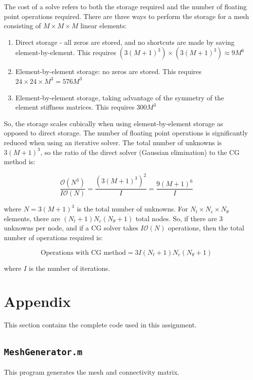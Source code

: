 \documentclass[10pt]{article}
\begin{document}
The cost of a solve refers to both the storage required and the number of floating point operations required. There are three ways to perform the storage for a mesh consisting of \(M\times M\times M\) linear elements:

\begin{enumerate}
\item Direct storage - all zeros are stored, and no shortcuts are made by saving element-by-element. This requires \((3(M+1)^3)\times(3(M+1)^3)\approx9M^6\)
\item Element-by-element storage: no zeros are stored. This requires \(24\times24\times M^3=576M^3\)
\item Element-by-element storage, taking advantage of the symmetry of the element stiffness matrices. This requires \(300M^3\)
\end{enumerate} 

So, the storage scales cubically when using element-by-element storage as opposed to direct storage. The number of floating point operations is significantly reduced when using an iterative solver. The total number of unknowns is \(3(M+1)^3\), so the ratio of the direct solver (Gaussian elimination) to the CG method is:

\begin{equation}
\frac{\mathscr{O}(N^3)}{I\mathscr{O}(N)}=\frac{\left(3(M+1)^3\right)^2}{I}=\frac{9(M+1)^6}{I}
\end{equation}

where \(N=3(M+1)^3\) is the total number of unknowns. For \(N_t\times N_c\times N_\theta\) elements, there are \((N_t+1)N_c(N_\theta+1)\) total nodes. So, if there are 3 unknowns per node, and if a CG solver takes \(I\mathscr{O}(N)\) operations, then the total number of operations required is:

\begin{equation}
\text{Operations with CG method}=3I(N_t+1)N_c(N_\theta+1)
\end{equation}
 
 where \(I\) is the number of iterations.

\section{Appendix}

This section contains the complete code used in this assignment. 

\subsection{\texttt{MeshGenerator.m}}
This program generates the mesh and connectivity matrix.

\end{document}
